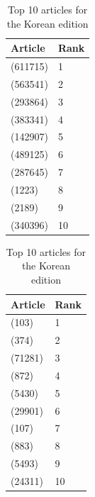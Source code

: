 \begin{table}[htbp]
    \begin{minipage}{.45\linewidth}
        \centering
        \begin{tabular}{ll}
            \toprule
            Article & Rank\\
            \midrule
            (611715) & 1\\
            (563541) & 2\\
            (293864) & 3\\
            (383341) & 4\\
            (142907) & 5\\
            (489125) & 6\\
            (287645) & 7\\
            (1223) & 8\\
            (2189) & 9\\
            (340396) & 10\\
            \bottomrule
        \end{tabular}
        \caption{Top 10 articles for the Japanese edition}
    \end{minipage}
    \hfill
    \begin{minipage}{.45\linewidth}
        \centering
        \begin{tabular}{ll}
            \toprule
            Article & Rank\\
            \midrule
            (103) & 1\\
            (374) & 2\\
            (71281) & 3\\
            (872) & 4\\
            (5430) & 5\\
            (29901) & 6\\
            (107) & 7\\
            (883) & 8\\
            (5493) & 9\\
            (24311) & 10\\
            \bottomrule
        \end{tabular}
        \caption{Top 10 articles for the Korean edition}
    \end{minipage}
\end{table}

